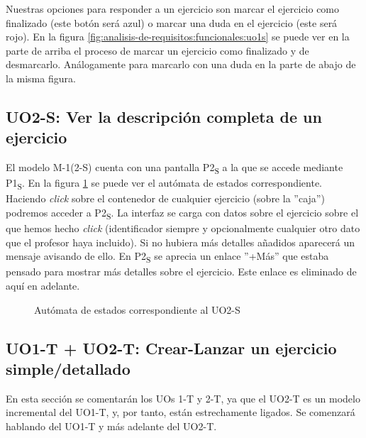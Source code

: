Nuestras opciones para responder a un ejercicio son marcar el ejercicio como finalizado (este botón será azul) o marcar una duda en el ejercicio (este será rojo). En la figura \ref{fig:analisis-de-requisitos:funcionales:uo1s} se puede ver en la parte de arriba el proceso de marcar un ejercicio como finalizado y de desmarcarlo. Análogamente para marcarlo con una duda en la parte de abajo de la misma figura.\\

\subsection{UO2-S: Ver la descripción completa de un ejercicio}
\label{analisis-de-requisitos:funcionales:uo2s}

El modelo M-1(2-S) cuenta con una pantalla P2\textsubscript{S} a la que se accede mediante P1\textsubscript{S}. En la figura \ref{fig:analisis-de-requisitos:funcionales:uo2s} se puede ver el autómata de estados correspondiente. Haciendo \textit{click} sobre el contenedor de cualquier ejercicio (sobre la ''caja'') podremos acceder a P2\textsubscript{S}. La interfaz se carga con datos sobre el ejercicio sobre el que hemos hecho \textit{click} (identificador siempre y opcionalmente cualquier otro dato que el profesor haya incluido). Si no hubiera más detalles añadidos aparecerá un mensaje avisando de ello. En P2\textsubscript{S} se aprecia un enlace ''+Más'' que estaba pensado para mostrar más detalles sobre el ejercicio. Este enlace es eliminado de aquí en adelante.\\

\noindent
\begin{figure}[!htbp]
\noindent
{}
\caption{Autómata de estados correspondiente al UO2-S}
\label{fig:analisis-de-requisitos:funcionales:uo2s}
\end{figure}

\subsection{UO1-T + UO2-T: Crear-Lanzar un ejercicio simple/detallado}
\label{analisis-de-requisitos:funcionales:uo1t}

En esta sección se comentarán los UOs 1-T y 2-T, ya que el UO2-T es un modelo incremental del UO1-T, y, por tanto, están estrechamente ligados. Se comenzará hablando del UO1-T y más adelante del UO2-T.\\

